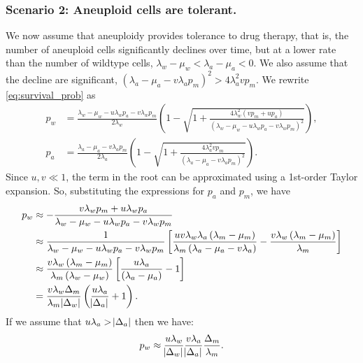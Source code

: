 \documentclass[12pt]{extarticle}
\begin{document}
\begin{appendices}
\subsubsection*{Scenario 2: Aneuploid cells are tolerant.} 

We now assume that aneuploidy provides tolerance to drug therapy, that is, the number of aneuploid cells significantly declines over time, but at a lower rate than the number of wildtype cells, $\lambda_w - \mu_w < \lambda_a - \mu_a < 0$. We also assume that the decline are significant, $\left(\lambda_a-\mu_a-v\lambda_ap_m\right)^2 > 4\lambda_a^2 v p_m$.
We rewrite \cref{eq:survival_prob} as
\begin{equation}
\begin{aligned}
p_w&=\frac{\lambda_w-\mu_w-u\lambda_wp_a-v\lambda_wp_m}{2\lambda_w}\left(1-\sqrt{1+\frac{4\lambda_w^2\left(vp_m+up_a\right)}{\left(\lambda_w-\mu_w-u\lambda_wp_a-v\lambda_wp_m\right)^2}}\right), \\
p_a&=\frac{\lambda_a-\mu_a-v\lambda_ap_m}{2\lambda_a}\left(1-\sqrt{1+\frac{4\lambda_a^2vp_m}{\left(\lambda_a-\mu_a-v\lambda_ap_m\right)^2}}\right) .
\end{aligned}
\end{equation}
Since $u,v\ll1$, the term in the root can be approximated using a 1st-order Taylor expansion. So, substituting the expressions for $p_a$ and $p_m$, we have
\begin{equation} \label{eq:survprobwinitial}
\begin{aligned}
p_w&\approx-\frac{v\lambda_wp_m+u\lambda_wp_a}{\lambda_w-\mu_w-u\lambda_wp_a-v\lambda_wp_m}\\
&\approx\frac{1}{\lambda_w-\mu_w-u\lambda_wp_a-v\lambda_wp_m}\left[\frac{uv\lambda_w\lambda_a\left(\lambda_m-\mu_m\right)}{\lambda_m\left(\lambda_a-\mu_a-v\lambda_a\right)}-\frac{v\lambda_w\left(\lambda_m-\mu_m\right)}{\lambda_m}\right]\\ 
&\approx\frac{v\lambda_w\left(\lambda_m-\mu_m\right)}{\lambda_m\left(\lambda_w-\mu_w\right)}\left[\frac{u\lambda_a}{\left(\lambda_a-\mu_a\right)}-1\right] \\
&=\frac{v\lambda_w\Delta_m}{\lambda_m \abs{\Delta_w}}\left(\frac{u\lambda_a}{\abs{\Delta_a}}+1\right) .
\end{aligned}
\end{equation}
If we assume that $u\lambda_a>\abs{\Delta_a}$ then we have:
\begin{equation}\label{eq:pw_tolerant}
p_w\approx\frac{u\lambda_w}{\abs{\Delta_w}} \frac{v\lambda_a}{\abs{\Delta_a}} \frac{\Delta_m}{\lambda_m}.
\end{equation}


\end{appendices}
\end{document}
